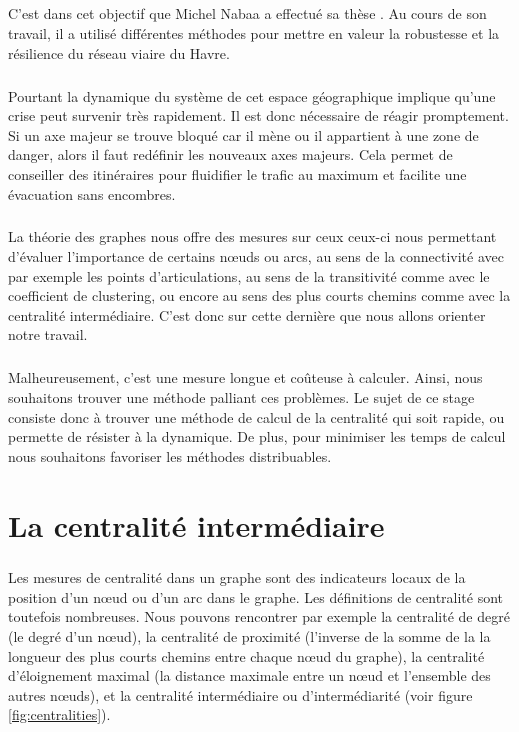 \documentclass[a4paper, 10pt]{report}
\begin{document}
\paragraph{}C'est dans cet objectif que Michel Nabaa a effectué sa thèse \cite{Nabaa2011Morphodyn}. Au cours de son travail, il a utilisé différentes méthodes pour mettre en valeur la robustesse et la résilience du réseau viaire du Havre.

\paragraph{}Pourtant la dynamique du système de cet espace géographique implique qu'une crise peut survenir très rapidement. Il est donc nécessaire de réagir promptement. Si un axe majeur se trouve bloqué car il mène ou il appartient à une zone de danger, alors il faut redéfinir les nouveaux axes majeurs. Cela permet de conseiller des itinéraires pour fluidifier le trafic au maximum et facilite une évacuation sans encombres.

\paragraph{}La théorie des graphes nous offre des mesures sur ceux ceux-ci nous permettant d'évaluer l'importance de certains n\oe uds ou arcs, au sens de la connectivité avec par exemple les points d'articulations, au sens de la transitivité comme avec le coefficient de clustering, ou encore au sens des plus courts chemins comme avec la centralité intermédiaire. C'est donc sur cette dernière que nous allons orienter notre travail.

\paragraph{}Malheureusement, c'est une mesure longue et coûteuse à calculer. Ainsi, nous souhaitons trouver une méthode palliant ces problèmes. Le sujet de ce stage consiste donc à trouver une méthode de calcul de la centralité qui soit rapide, ou permette de résister à la dynamique. De plus, pour minimiser les temps de calcul nous souhaitons favoriser les méthodes distribuables.

\chapter{La centralité intermédiaire}

\paragraph{}Les mesures de centralité dans un graphe sont des indicateurs locaux de la position d'un n\oe ud ou d'un arc dans le graphe. Les définitions de centralité sont toutefois nombreuses. Nous pouvons rencontrer par exemple la centralité de degré (le degré d'un n\oe ud), la centralité de proximité \cite{Sadibussi1966Centrality} (l'inverse de la somme de la la longueur des plus courts chemins entre chaque n\oe ud du graphe), la centralité d'éloignement maximal (la distance maximale entre un n\oe ud et l'ensemble des autres n\oe uds), et la centralité intermédiaire ou d'intermédiarité (voir figure \ref{fig:centralities}).
\end{document}
